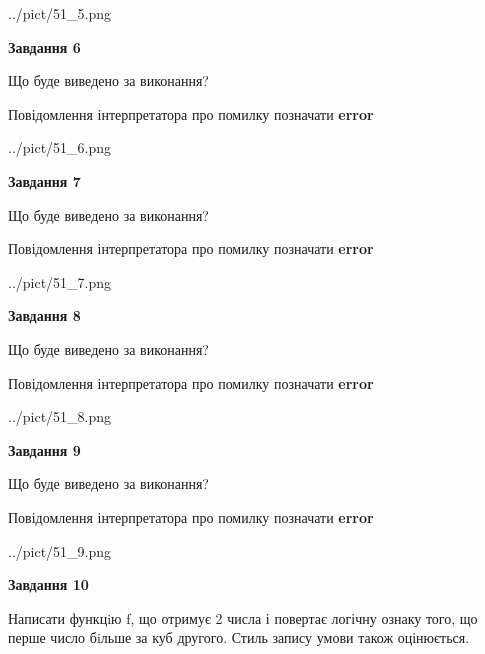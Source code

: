 \documentclass[12pt, ukrainian]{article}
\begin{document}
{\begin {large}
\begin{center}
	{../pict/51_5.png}
\end{center}
\newpage

{\begin {center}\textbf{Завдання 6}\end {center}}\par
Що буде виведено за виконання? \par
Повідомлення інтерпретатора про помилку позначати \textbf{error}

\begin{center}
	{../pict/51_6.png}
\end{center}
\newpage

{\begin {center}\textbf{Завдання 7}\end {center}}\par
Що буде виведено за виконання? \par
Повідомлення інтерпретатора про помилку позначати \textbf{error}

\begin{center}
	{../pict/51_7.png}
\end{center}
\newpage

{\begin {center}\textbf{Завдання 8}\end {center}}\par
Що буде виведено за виконання? \par
Повідомлення інтерпретатора про помилку позначати \textbf{error}

\begin{center}
	{../pict/51_8.png}
\end{center}
\newpage

{\begin {center}\textbf{Завдання 9}\end {center}}\par
Що буде виведено за виконання? \par
Повідомлення інтерпретатора про помилку позначати \textbf{error}

\begin{center}
	{../pict/51_9.png}
\end{center}
\newpage

{\begin {center}\textbf{Завдання 10}\end {center}}\par

Написати функцiю f, що отримує 2 числа і повертає логічну ознаку того, що перше число бiльше за куб другого. Стиль запису умови також оцінюється.\par
\newpage

\end {large}}
\end{document}
